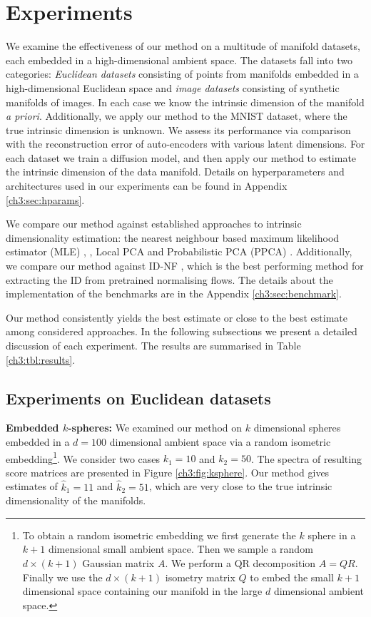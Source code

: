 \section{Experiments}
\label{ch3:sec:experiments}


We examine the effectiveness of our method on a multitude of manifold datasets, each embedded in a high-dimensional ambient space. The datasets fall into two categories: \textit{Euclidean datasets} consisting of points from manifolds embedded  in a high-dimensional Euclidean space and \textit{image datasets} consisting of synthetic manifolds of images.
In each case we know the intrinsic dimension of the manifold \textit{a priori}. Additionally, we apply our method to the MNIST dataset, where the true intrinsic dimension is unknown. We assess its performance via comparison with the reconstruction error of auto-encoders with various latent dimensions.  For each dataset we train a diffusion model, and then apply our method to estimate the intrinsic dimension of the data manifold. Details on hyperparameters and architectures used in our experiments can be found in Appendix \ref{ch3:sec:hparams}. 

We compare our method against established approaches to intrinsic dimensionality estimation: the nearest neighbour based maximum likelihood estimator (MLE) \cite{dim_MLE}, \cite{haro_mle}, Local PCA \cite{fan_local_pca} and Probabilistic PCA (PPCA) \cite{auto_ppca} \cite{ppca}. Additionally, we compare our method against ID-NF \cite{horvat2022nfid}, which is the best performing method for extracting the ID from pretrained normalising flows. The details about the implementation of the benchmarks are in the Appendix \ref{ch3:sec:benchmark}.

Our method consistently yields the best estimate or close to the best estimate among considered approaches. In the following subsections we present a detailed discussion of each experiment. The results are summarised in Table \ref{ch3:tbl:results}.

\subsection{Experiments on Euclidean datasets}
\textbf{Embedded $k$-spheres:} We examined our method on $k$ dimensional spheres embedded in a $d=100$ dimensional ambient space via a random isometric embedding\footnote{To obtain a random isometric embedding we first generate the $k$ sphere in a $k+1$ dimensional small ambient space. Then we sample a random $d\times (k+1)$ Gaussian matrix $A$. We perform a QR decomposition $A = QR$. Finally we use the $d\times (k+1)$ isometry matrix $Q$ to embed the small $k+1$ dimensional space containing our manifold in the large $d$ dimensional ambient space.}. We consider two cases $k_1=10$ and $k_2=50$. The spectra of resulting score matrices are presented in Figure \ref{ch3:fig:ksphere}. Our method gives estimates of $\hat{k}_1 = 11$ and $\hat{k}_2 = 51$, which are very close to the true intrinsic dimensionality of the manifolds.

